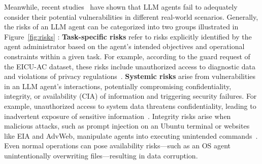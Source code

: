 Meanwhile, recent studies~\cite{he2024securityaiagents} have shown that LLM agents fail to adequately consider their potential vulnerabilities in different real-world scenarios. Generally, the risks of an LLM agent can be categorized into two groups illustrated in Figure~\ref{fig:risks} : \textbf{Task-specific risks} refer to risks explicitly identified by the agent administrator based on the agent’s intended objectives and operational constraints within a given task. For example, according to the guard request of the EICU-AC dataset, these risks include unauthorized access to diagnostic data and violations of privacy regulations~\cite{xiang2024guardagentsafeguardllmagents}. \textbf{Systemic risks} arise from vulnerabilities in an LLM agent’s interactions, potentially compromising confidentiality, integrity, or availability (CIA) of information and triggering security failures. For example, unauthorized access to system data threatens confidentiality, leading to inadvertent exposure of sensitive information~\cite{yuan2024rjudgebenchmarkingsafetyrisk}. Integrity risks arise when malicious attacks, such as prompt injection on an Ubuntu terminal or websites like EIA and AdvWeb, manipulate agents into executing unintended commands~\cite{liu2024automaticuniversalpromptinjection, liao2024eiaenvironmentalinjectionattack, xu2024advwebcontrollableblackboxattacks}. Even normal operations can pose availability risks—such as an OS agent unintentionally overwriting files—resulting in data corruption.




